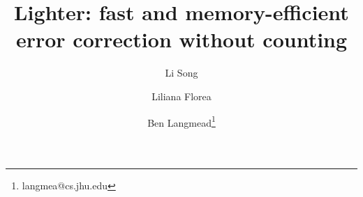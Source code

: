 \documentclass{bmcart}
\begin{document}
\newcommand{\forexample}{e.g.\@\xspace}
\newcommand{\thatis}{i.e.\@\xspace}
\newcommand{\andothers}{et al.\@\xspace}
\newcommand{\kmer}{\ensuremath{k}-mer\xspace}
\newcommand{\kmers}{\ensuremath{k}-mers\xspace}
\newcommand{\tool}{Lighter\xspace}
\newcommand{\ecoli}{\emph{E. coli}\xspace}

\newcommand\myworries[1]{\textcolor{red}{#1}}%


\title{Lighter: fast and memory-efficient error correction without counting}


\author[1,2]{Li Song}
\author[2,1]{Liliana Florea}
\author[1,2]{Ben Langmead\thanks{langmea@cs.jhu.edu}}

\renewcommand\Authands{ and }




\maketitle

\end{document}
